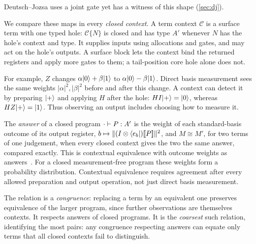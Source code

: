 \documentclass[acmsmall,screen,review,anonymous,nonacm]{acmart}
\begin{document}
Deutsch--Jozsa uses a joint gate yet has a witness of this shape
(\cref{sec:dj}).

We compare these maps in every \emph{closed context}.
A term context $\mathcal C$ is a surface term with one typed hole:
$\mathcal C\{N\}$ is closed and has type $A'$ whenever $N$ has the hole's
context and type. It supplies inputs using allocations and gates, and
may act on the hole's outputs. A surface block lets the context bind the returned registers and apply
more gates to them; a tail-position core hole alone does not.

For example, $Z$ changes $\alpha\lvert 0 \rangle+\beta\lvert 1 \rangle$ to
$\alpha\lvert 0 \rangle-\beta\lvert 1 \rangle$. Direct basis measurement sees the same weights
$|\alpha|^2,|\beta|^2$ before and after this change. A context can detect
it by preparing $\lvert + \rangle$ and applying $H$ after the hole: $H I\lvert + \rangle=\lvert 0 \rangle$,
whereas $H Z\lvert + \rangle=\lvert 1 \rangle$. Thus observing an output includes choosing
how to measure it.

The \emph{answer} of a closed program
$\cdot \vdash P : A'$ is the weight of each standard-basis outcome of its output
register, $b \mapsto \lVert(I \otimes \langle e_b \rvert)[\![P]\!]\rVert^{2}$, and
$M \cong M'$, for two terms of one judgement, when every closed context gives the two the same answer,
compared exactly. This is contextual equivalence with outcome weights as
answers~\cite[Chapters~46--47]{Harper2016PFPL}.
For a closed measurement-free program these weights form a probability
distribution. Contextual equivalence requires agreement after every
allowed preparation and output operation, not just direct basis measurement.

The relation is a \emph{congruence}: replacing a term by an equivalent
one preserves equivalence of the larger program, since further
observations are themselves contexts. It respects answers of closed
programs. It is the \emph{coarsest} such relation, identifying the most
pairs: any congruence respecting answers can equate only terms that
all closed contexts fail to distinguish.
\end{document}
